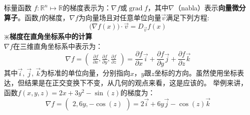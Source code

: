 \documentclass[UTF8]{ctexart}
\begin{document}
{\begin{question}
标量函数 $f \colon \mathbb {R} ^{n}\mapsto \mathbb {R}$的梯度表示为：$\nabla f $或$\operatorname {grad} f$，其中$\nabla$（nabla）表示\textbf{向量微分算子}。函数$f$的梯度，$\nabla f$为向量场且对任意单位向量$\vec v$满足下列方程:
\begin{equation}
	{\big (} \nabla f(x) {\big )} \cdot \vec v =D_{\vec v} f(x)
\end{equation}
$\divideontimes$\textbf{梯度在直角坐标系中的计算}\\
$\nabla f$在三维直角坐标系中表示为：
\begin{equation}
	\nabla f={\begin{pmatrix}{\frac {\partial f}{\partial x}},{\frac {\partial f}{\partial y}},{\frac {\partial f}{\partial z}}\end{pmatrix}}={\frac {\partial f}{\partial x}}\vec i +{\frac {\partial f}{\partial y}}\vec j +{\frac {\partial f}{\partial z}}\vec k
\end{equation}其中$\vec i$, $\vec j$, $\vec k$为标准的单位向量，分别指向$x$，$y$跟$z$坐标的方向。虽然使用坐标表达，但结果是在正交变换下不变，从几何的观点来看，这是应该的。
举例来讲，函数$ f(x,y,z)=2x+3y^{2}-\sin(z)$的梯度为：
\begin{equation}
	\nabla f={\begin{pmatrix}{2},{6y},{-\cos(z)}\end{pmatrix}}=2\vec i +6y\vec j -\cos(z)\vec k
\end{equation}
\end{question}

}
\end{document}
